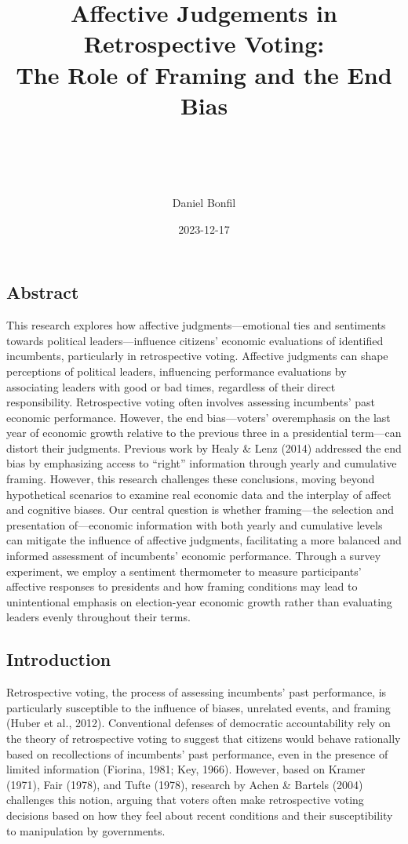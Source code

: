 \documentclass[
]{article}
\title{\hfill\break
\hfill\break
Affective Judgements in Retrospective Voting:\\
The Role of Framing and the End Bias\\
\strut \\}
\subtitle{\hfill\break
\hfill\break
FGV EBAPE\\
\strut \\
\strut \\
First Qualifying Examination\\
(Conceptual Paper)\\
\strut \\}
\author{Daniel Bonfil}
\date{2023-12-17}
\begin{document}
\maketitle

{
\setcounter{tocdepth}{2}
\tableofcontents
}
\newpage
\doublespacing

\hypertarget{abstract}{%
\subsection{Abstract}\label{abstract}}

This research explores how affective judgments---emotional ties and
sentiments towards political leaders---influence citizens' economic
evaluations of identified incumbents, particularly in retrospective
voting. Affective judgments can shape perceptions of political leaders,
influencing performance evaluations by associating leaders with good or
bad times, regardless of their direct responsibility. Retrospective
voting often involves assessing incumbents' past economic performance.
However, the end bias---voters' overemphasis on the last year of
economic growth relative to the previous three in a presidential
term---can distort their judgments. Previous work by Healy \& Lenz
(2014) addressed the end bias by emphasizing access to ``right''
information through yearly and cumulative framing. However, this
research challenges these conclusions, moving beyond hypothetical
scenarios to examine real economic data and the interplay of affect and
cognitive biases. Our central question is whether framing---the
selection and presentation of---economic information with both yearly
and cumulative levels can mitigate the influence of affective judgments,
facilitating a more balanced and informed assessment of incumbents'
economic performance. Through a survey experiment, we employ a sentiment
thermometer to measure participants' affective responses to presidents
and how framing conditions may lead to unintentional emphasis on
election-year economic growth rather than evaluating leaders evenly
throughout their terms.

\hypertarget{introduction}{%
\subsection{Introduction}\label{introduction}}

Retrospective voting, the process of assessing incumbents' past
performance, is particularly susceptible to the influence of biases,
unrelated events, and framing (Huber et al., 2012). Conventional
defenses of democratic accountability rely on the theory of
retrospective voting to suggest that citizens would behave rationally
based on recollections of incumbents' past performance, even in the
presence of limited information (Fiorina, 1981; Key, 1966). However,
based on Kramer (1971), Fair (1978), and Tufte (1978), research by Achen
\& Bartels (2004) challenges this notion, arguing that voters often make
retrospective voting decisions based on how they feel about recent
conditions and their susceptibility to manipulation by governments.
\end{document}
